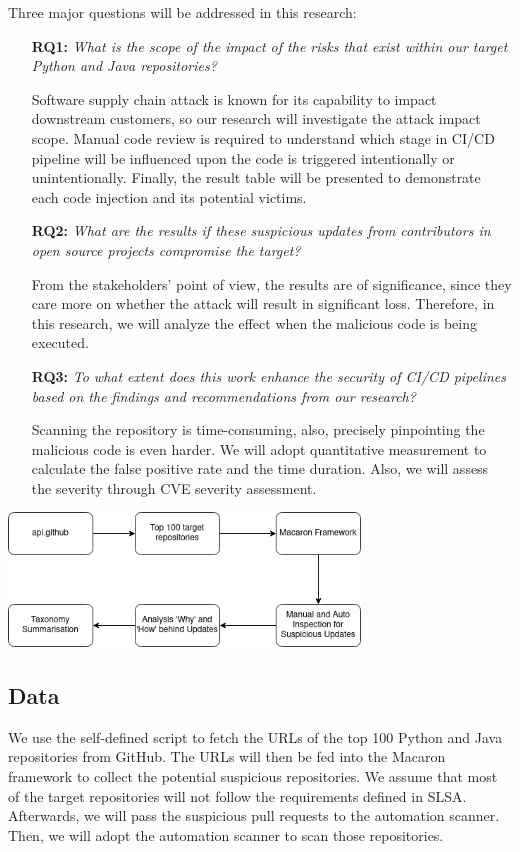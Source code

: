 Three major questions will be addressed in this research:
\begin{enumerate}
    \item[{\textbf{RQ1:}}] \emph{What is the scope of the impact of the risks that exist within our target Python and Java repositories?}
    
    Software supply chain attack is known for its capability to impact downstream customers, so our research will investigate
    the attack impact scope. Manual code review is required to understand which stage in CI/CD pipeline will be influenced 
    upon the code is triggered intentionally or unintentionally. Finally, the result table will be presented to demonstrate each 
    code injection and its potential victims.  
    \item[{\textbf{RQ2:}}] \emph{What are the results if these suspicious updates from contributors in open source projects compromise the target?}
    
    From the stakeholders' point of view, the results are of significance, since they care more on whether the attack 
    will result in significant loss. Therefore, in this research, we will analyze the effect when the malicious code is being executed.

    \item[{\textbf{RQ3:}}] \emph{To what extent does this work enhance the security of CI/CD pipelines based on the findings and recommendations from our research?}

    Scanning the repository is time-consuming, also, precisely pinpointing the malicious code is even harder. We will adopt 
    quantitative measurement to calculate the false positive rate and the time duration. Also, we will assess the severity 
    through CVE severity assessment.
\end{enumerate}

\begin{center}
    \includegraphics[width=0.7\textwidth]{./screenshot/research_method.png}
\end{center}

\subsection{Data}
We use the self-defined script to fetch the URLs of the top 100 Python and Java repositories from GitHub.
The URLs will then be fed into the Macaron framework to collect the potential suspicious repositories.
We assume that most of the target repositories will not follow the requirements defined in SLSA.
Afterwards, we will pass the suspicious pull requests to the automation scanner.
Then, we will adopt the automation scanner to scan those repositories.

